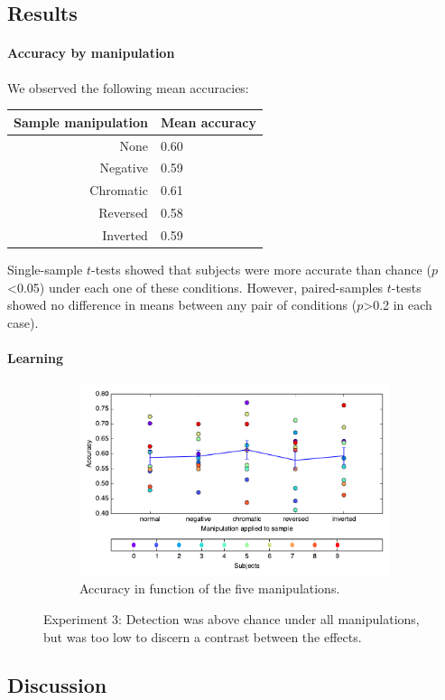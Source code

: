 \subsection{Results}

\paragraph{Accuracy by manipulation}

We observed the following mean accuracies:

\begin{center}
\begin{tabular}{ r | l   }
\textbf{Sample manipulation} & \textbf{Mean accuracy}\\
\hline
None&  0.60\\
Negative&  0.59\\
Chromatic& 0.61\\
Reversed&  0.58\\
Inverted&  0.59\\
\end{tabular}
\end{center}

Single-sample $t$-tests showed that subjects were more accurate than chance ($p$<0.05) under each one of these conditions. However, paired-samples $t$-tests showed no difference in means between any pair of conditions ($p$>0.2 in each case).

\paragraph{Learning}

\begin{figure}[htp]
\centering
\begin{subfigure}[b]{\textwidth}
\centering
                \includegraphics[width=12cm]{img/fig_fire5-manips1_correct_manip.pdf}
                \caption{Accuracy in function of the five manipulations.}
          
        \end{subfigure}

\caption{Experiment 3: Detection was above chance under all manipulations, but was too low to discern a contrast between the effects.}
\end{figure}

\subsection{Discussion}
